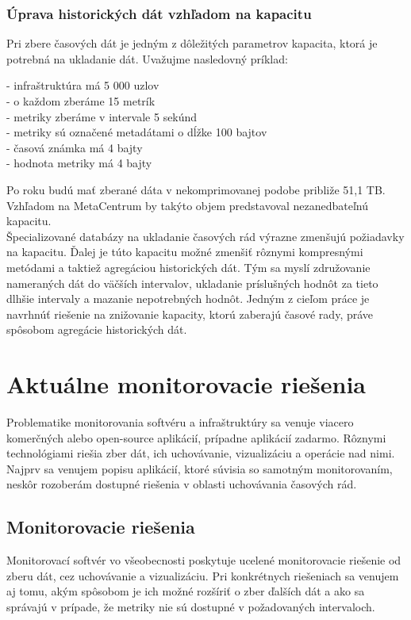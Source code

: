 \documentclass[printed,11pt,twoside,color,cover,table]{fithesis3}
\begin{document}
\subsection{Úprava historických dát vzhľadom na kapacitu}
\label{sec:example}
Pri zbere časových dát je jedným z dôležitých parametrov kapacita, ktorá je potrebná na ukladanie dát. Uvažujme nasledovný príklad:
\begin{description}
\item[- infraštruktúra má 5 000 uzlov]
\item[- o každom zberáme 15 metrík]
\item[- metriky zberáme v intervale 5 sekúnd]
\item[- metriky sú označené metadátami o dĺžke 100 bajtov]
\item[- časová známka má 4 bajty]
\item[- hodnota metriky má 4 bajty]
\end{description} 
Po roku budú mať zberané dáta v nekomprimovanej podobe približe 51,1 TB. Vzhľadom na MetaCentrum by takýto objem predstavoval nezanedbateľnú kapacitu.
\\Špecializované databázy na ukladanie časových rád výrazne zmenšujú požiadavky na kapacitu. Ďalej je túto kapacitu možné zmenšiť 
rôznymi kompresnými metódami a taktiež agregáciou historických dát. Tým sa myslí združovanie nameraných dát do väčších intervalov,
ukladanie príslušných hodnôt za tieto dlhšie intervaly a mazanie nepotrebných hodnôt. Jedným z cieľom práce je navrhnúť riešenie na znižovanie kapacity, ktorú zaberajú časové rady,
práve spôsobom agregácie historických dát.

\chapter{Aktuálne monitorovacie riešenia}
Problematike monitorovania softvéru a infraštruktúry sa venuje viacero komerčných alebo open-source aplikácií, prípadne aplikácií zadarmo. Rôznymi technológiami riešia zber dát, ich uchovávanie, vizualizáciu a operácie nad
nimi. Najprv sa venujem popisu aplikácií, ktoré súvisia so samotným monitorovaním, neskôr rozoberám dostupné riešenia v oblasti uchovávania časových rád.

\section{Monitorovacie riešenia}
Monitorovací softvér vo všeobecnosti poskytuje ucelené monitorovacie riešenie od zberu dát, cez uchovávanie a vizualizáciu. Pri konkrétnych riešeniach sa venujem aj tomu, akým spôsobom je ich možné
rozšíriť o zber ďalších dát a ako sa správajú v prípade, že metriky nie sú dostupné v požadovaných intervaloch.
\end{document}
